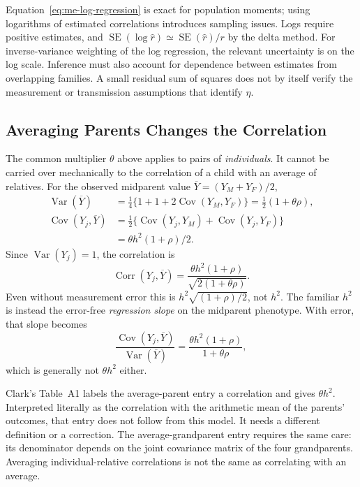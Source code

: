 Equation~\eqref{eq:me-log-regression} is exact for population moments;
using logarithms of estimated correlations introduces sampling issues.
Logs require positive estimates, and
$\operatorname{SE}(\log\widehat r)\simeq
\operatorname{SE}(\widehat r)/r$ by the delta method. For inverse-variance weighting of the log regression, the relevant
uncertainty is on the log scale. Inference must also account for
dependence between estimates from overlapping families. A small
residual sum of squares does not by itself verify the measurement or
transmission assumptions that identify $\eta$.
\subsection{Averaging Parents Changes the Correlation}
\label{sec:me-averages}

The common multiplier $\theta$ above applies to pairs of \emph{individuals}.
It cannot be carried over mechanically to the correlation of a child
with an average of relatives. For the observed midparent value
$\overline Y=(Y_M+Y_F)/2$,
\begin{align*}
 \operatorname{Var}(\overline Y)
 &=\tfrac14\{1+1+2\operatorname{Cov}(Y_M,Y_F)\}
   =\tfrac12(1+\theta\rho),\\
 \operatorname{Cov}(Y_j,\overline Y)
 &=\tfrac12\{\operatorname{Cov}(Y_j,Y_M)
             +\operatorname{Cov}(Y_j,Y_F)\}\\
 &=\theta h^2(1+\rho)/2.
\end{align*}
Since $\operatorname{Var}(Y_j)=1$, the correlation is
\begin{equation}
 \boxed{\operatorname{Corr}(Y_j,\overline Y)
 =\frac{\theta h^2(1+\rho)}
        {\sqrt{2(1+\theta\rho)}}.}
 \label{eq:me-midparent}
\end{equation}
Even without measurement error this is
$h^2\sqrt{(1+\rho)/2}$, not $h^2$. The familiar $h^2$ is instead the
error-free \emph{regression slope} on the midparent phenotype.
With error, that slope becomes
\[
 \frac{\operatorname{Cov}(Y_j,\overline Y)}
      {\operatorname{Var}(\overline Y)}
 =\frac{\theta h^2(1+\rho)}{1+\theta\rho},
\]
which is generally not $\theta h^2$ either.

Clark's Table~A1 \citep[p.~296]{Clark2026} labels the average-parent entry a correlation and gives
$\theta h^2$. Interpreted literally as the correlation with the arithmetic
mean of the parents' outcomes, that entry does not follow from this model.
It needs a different definition or a correction. The average-grandparent
entry requires the same care: its denominator depends on the joint
covariance matrix of the four grandparents. Averaging individual-relative
correlations is not the same as correlating with an average.

